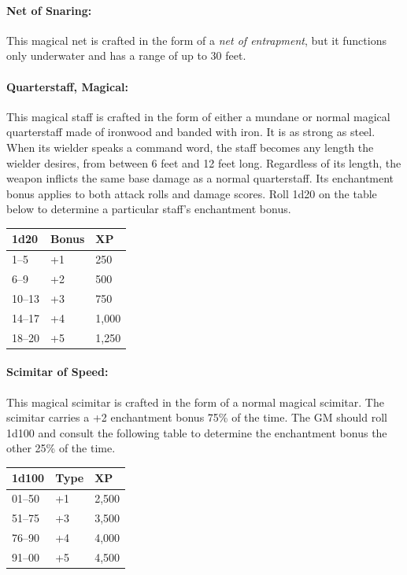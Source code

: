 \begin{multicols}{2}
\paragraph{Net of Snaring:} This magical net is crafted in the form of a \textit{net of entrapment}, but it functions only underwater and has a range of up to 30 feet.

\paragraph{Quarterstaff, Magical:} This magical staff is crafted in the form of either a mundane or normal magical quarterstaff made of ironwood and banded with iron.  It is as strong as steel.  When its wielder speaks a command word, the staff becomes any length the wielder desires, from between 6 feet and 12 feet long.  Regardless of its length, the weapon inflicts the same base damage as a normal quarterstaff.  Its enchantment bonus applies to both attack rolls and damage scores. Roll 1d20 on the table below to determine a particular staff's enchantment bonus.  
 
\noindent \begin{tabular}{|p{}|p{}|p{}|}
\hline
1d20	& Bonus	& XP \\
\hline\hline
\rowcolor[gray]{0.9}1--5	& +1	& 250 \\
6--9	& +2	& 500 \\
\rowcolor[gray]{0.9}10--13	& +3	& 750 \\
14--17	& +4	& 1,000 \\
\rowcolor[gray]{0.9}18--20	& +5	& 1,250 \\
\hline
\end{tabular}

\paragraph{Scimitar of Speed:} This magical scimitar is crafted in the form of a normal magical scimitar.  The scimitar carries a +2 enchantment bonus 75\% of the time.  The GM should roll 1d100 and consult the following table to determine the enchantment bonus the other 25\% of the time.  

\noindent \begin{tabular}{|p{}|p{}|p{}|}
\hline
1d100	& Type	& XP \\
\hline\hline
\rowcolor[gray]{0.9}01--50	& +1	& 2,500 \\
51--75	& +3	& 3,500 \\
\rowcolor[gray]{0.9}76--90	& +4	& 4,000 \\
91--00	& +5	& 4,500 \\
\hline
\end{tabular}


\end{multicols}
